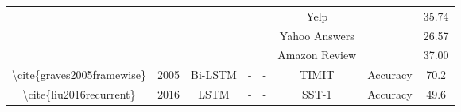 \begin{table}[]
\begin{tabular}{|c|c|c|c|c|c|cc|}
                                                                                          &                                            &                                                   &                                                           &                                                                                                                        & Yelp                                                  & \multicolumn{1}{c|}{}                                                                                                              & 35.74                      \\ \cline{6-6} \cline{8-8} 
                                                                                          &                                            &                                                   &                                                           &                                                                                                                        & Yahoo Answers                                         & \multicolumn{1}{c|}{}                                                                                                              & 26.57                      \\ \cline{6-6} \cline{8-8} 
                                                                                          &                                            &                                                   &                                                           &                                                                                                                        & Amazon Review                                         & \multicolumn{1}{c|}{}                                                                                                              & 37.00                      \\ \hline
    \textbackslash{}cite\{graves2005framewise\}                                           & 2005                                       & Bi-LSTM                                           & -                                                         & -                                                                                                                      & TIMIT                                                 & \multicolumn{1}{c|}{Accuracy}                                                                                                      & 70.2                       \\ \hline
    \multirow{4}{*}{\textbackslash{}cite\{liu2016recurrent\}}                             & \multirow{4}{*}{2016}                      & \multirow{4}{*}{LSTM}                             & \multirow{4}{*}{-}                                        & \multirow{4}{*}{-}                                                                                                     & SST-1                                                 & \multicolumn{1}{c|}{\multirow{4}{*}{Accuracy}}                                                                                     & 49.6                       \\ \cline{6-6} \cline{8-8} 

\end{tabular}
\end{table}
